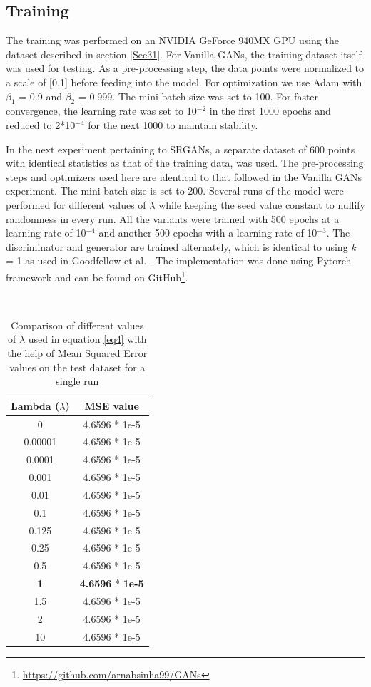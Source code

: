 \documentclass[10pt,journal,compsoc]{IEEEtran}
\begin{document}
\subsection{Training}
The training was performed on an NVIDIA GeForce 940MX GPU using the dataset described in section \ref{Sec31}. For Vanilla GANs, the training dataset itself was used for testing. As a pre-processing step, the data points were normalized to a scale of [0,1] before feeding into the model. For optimization we use Adam \cite{kingma2014adam} with $\beta_{1}$ = 0.9 and $\beta_{2}$ = 0.999. The mini-batch size was set to 100. For faster convergence, the learning rate was set to 10$^{-2}$ in the first 1000 epochs and reduced to 2*10$^{-4}$ for the next 1000 to maintain stability. 

In the next experiment pertaining to SRGANs, a separate dataset of 600 points with identical statistics as that of the training data, was used. The pre-processing steps and optimizers used here are identical to that followed in the Vanilla GANs experiment. The mini-batch size is set to 200. Several runs of the model were performed for different values of $\lambda$ while keeping the seed value constant to nullify randomness in every run. All the variants were trained with 500 epochs at a learning rate of 10$^{-4}$ and another 500 epochs with a learning rate of 10$^{-3}$. The discriminator and generator are trained alternately, which is identical to using \textit{k} = 1 as used in Goodfellow et al. \cite{vanillagans}. The implementation was done using Pytorch framework and can be found on GitHub\footnote{\url{https://github.com/arnabsinha99/GANs}}.

\

\renewcommand{\arraystretch}{1.5}
\begin{table}[h]
\begin{center}
\begin{tabular}{|c|c|}
\hline
Lambda ($\lambda$)&   MSE value\\
\hline
0& 4.6596 * 1e-5\\
\hline
0.00001& 4.6596 * 1e-5\\
\hline
0.0001& 4.6596 * 1e-5\\
\hline
0.001& 4.6596 * 1e-5\\
\hline
0.01& 4.6596 * 1e-5\\
\hline
0.1& 4.6596 * 1e-5\\
\hline
0.125& 4.6596 * 1e-5\\
\hline
0.25& 4.6596 * 1e-5\\
\hline
0.5& 4.6596 * 1e-5\\
\hline
\textbf{1}& \textbf{4.6596} * \textbf{1e-5}\\
\hline
1.5& 4.6596 * 1e-5\\
\hline
2& 4.6596 * 1e-5\\
\hline
10& 4.6596 * 1e-5\\
\hline
\end{tabular}
\end{center}
\caption{Comparison of different values of $\lambda$ used in equation \ref{eq4} with the help of Mean Squared Error values on the test dataset for a single run}
\label{table1}
\end{table}
\end{document}
